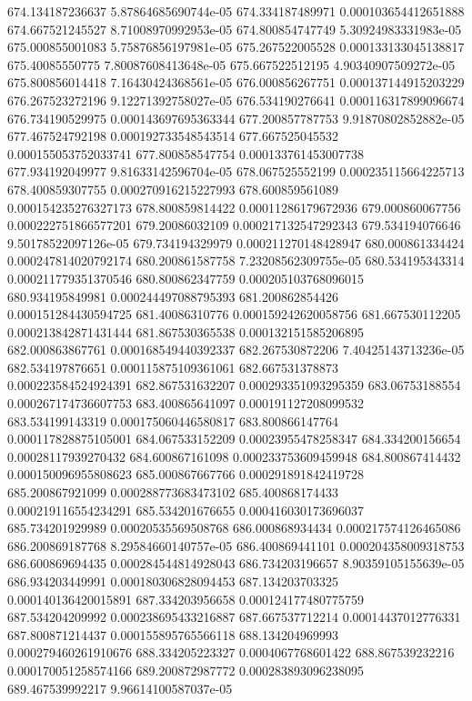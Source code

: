 {674.134187236637 5.87864685690744e-05
674.334187489971 0.000103654412651888
674.667521245527 8.71008970992953e-05
674.800854747749 5.30924983331983e-05
675.000855001083 5.75876856197981e-05
675.267522005528 0.000133133045138817
675.40085550775 7.80087608413648e-05
675.667522512195 4.90340907509272e-05
675.800856014418 7.16430424368561e-05
676.000856267751 0.000137144915203229
676.267523272196 9.12271392758027e-05
676.534190276641 0.000116317899096674
676.734190529975 0.000143697695363344
677.200857787753 9.91870802852882e-05
677.467524792198 0.000192733548543514
677.667525045532 0.000155053752033741
677.800858547754 0.000133761453007738
677.934192049977 9.81633142596704e-05
678.067525552199 0.000235115664225713
678.400859307755 0.000270916215227993
678.600859561089 0.000154235276327173
678.800859814422 0.00011286179672936
679.000860067756 0.000222751866577201
679.20086032109 0.000217132547292343
679.534194076646 9.50178522097126e-05
679.734194329979 0.000211270148428947
680.000861334424 0.000247814020792174
680.200861587758 7.23208562309755e-05
680.534195343314 0.000211779351370546
680.800862347759 0.000205103768096015
680.934195849981 0.000244497088795393
681.200862854426 0.000151284430594725
681.40086310776 0.000159242620058756
681.667530112205 0.000213842871431444
681.867530365538 0.000132151585206895
682.000863867761 0.000168549440392337
682.267530872206 7.40425143713236e-05
682.534197876651 0.000115875109361061
682.667531378873 0.000223584524924391
682.867531632207 0.000293351093295359
683.06753188554 0.000267174736607753
683.400865641097 0.000191127208099532
683.534199143319 0.000175060446580817
683.800866147764 0.000117828875105001
684.067533152209 0.00023955478258347
684.334200156654 0.00028117939270432
684.600867161098 0.000233753609459948
684.800867414432 0.000150096955808623
685.000867667766 0.000291891842419728
685.200867921099 0.000288773683473102
685.400868174433 0.000219116554234291
685.534201676655 0.000416030173696037
685.734201929989 0.00020535569508768
686.000868934434 0.000217574126465086
686.200869187768 8.29584660140757e-05
686.400869441101 0.000204358009318753
686.600869694435 0.000284544814928043
686.734203196657 8.90359105155639e-05
686.934203449991 0.000180306828094453
687.134203703325 0.000140136420015891
687.334203956658 0.000124177480775759
687.534204209992 0.000238695433216887
687.667537712214 0.00014437012776331
687.800871214437 0.000155895765566118
688.134204969993 0.000279460261910676
688.334205223327 0.0004067768601422
688.867539232216 0.000170051258574166
689.200872987772 0.000283893096238095
689.467539992217 9.96614100587037e-05
}
